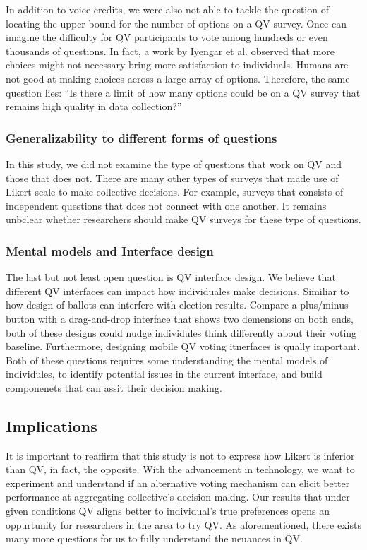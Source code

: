 In addition to voice credits, we were also not able to tackle the question of locating the upper bound for the number of options on a QV survey. Once can imagine the difficulty for QV participants to vote among hundreds or even thousands of questions. In fact, a work by Iyengar et al. \cite{iyengar2000choice} observed that more choices might not necessary bring more satisfaction to individuals. Humans are not good at making choices across a large array of options. Therefore, the same question lies: ``Is there a limit of how many options could be on a QV survey that remains high quality in data collection?''

\subsubsection{Generalizability to different forms of questions}
In this study, we did not examine the type of questions that work on QV and those that does not. There are many other types of surveys that made use of Likert scale to make collective decisions. For example, surveys that consists of independent questions that does not connect with one another. It remains unbclear whether researchers should make QV surveys for these type of questions.

\subsubsection{Mental models and Interface design}
The last but not least open question is QV interface design. We believe that different QV interfaces can impact how individuales make decisions. Similiar to how design of ballots can interfere with election results. Compare a plus/minus button with a drag-and-drop interface that shows two demensions on both ends, both of these designs could nudge individules think differently about their voting baseline. Furthermore, designing mobile QV voting itnerfaces is qually important. Both of these questions requires some understanding the mental models of individules, to identify potential issues in the current interface, and build componenets that can assit their decision making. 

\subsection{Implications}
It is important to reaffirm that this study is not to express how Likert is inferior than QV, in fact, the opposite. With the advancement in technology, we want to experiment and understand if an alternative voting mechanism can elicit better performance at aggregating collective's decision making. Our results that under given conditions QV aligns better to individual's true preferences opens an oppurtunity for researchers in the area to try QV. As aforementioned, there exists many more questions for us to fully understand the neuances in QV.






